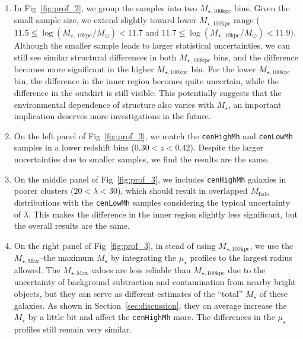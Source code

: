 \documentclass{emulateapj}
\def\rbcg{\texttt{cenHighMh}}
\def\nbcg{\texttt{cenLowMh}}
\def\mstar{{$M_{\star}$}}
\def\mhalo{{$M_{\mathrm{halo}}$}}
\def\mtot{{$M_{\star,100\mathrm{kpc}}$}}
\def\mmax{{$M_{\star,\mathrm{Max}}$}}
\def\mden{{$\mu_{\star}$}}
\begin{document}
\begin{CJK*}{UTF8}{gbsn}
\begin{enumerate}
        \item In Fig~\ref{fig:prof_2}, we group the samples into two \mtot{} bins. 
            Given the small sample size, we extend slightly toward lower \mtot{} range 
            ($11.5 \leq \log (M_{\star,\ 10\mathrm{kpc}}/M_{\odot}) < 11.7$ and 
             $11.7 \leq \log (M_{\star,\ 10\mathrm{kpc}}/M_{\odot}) < 11.9$). 
            Although the smaller sample leads to larger statistical uncertainties, 
            we can still see similar structural differences in both \mtot{} bins, 
            and the difference becomes more significant in the higher \mtot{} bin.  
            For the lower \mtot{} bin, the difference in the inner region becomes 
            quite uncertain, while the difference in the outskirt is still visible. 
            This potentially suggests that the environmental dependence of structure 
            also varies with \mstar{}, an important implication deserves more 
            investigations in the future.   

        \item On the left panel of Fig~\ref{fig:prof_3}, we match the \rbcg{} and 
            \nbcg{} samples in a lower redshift bins ($0.30 < z < 0.42$).
            Despite the larger uncertainties due to smaller samples, we find the 
            results are the same.
            
        \item On the middle panel of Fig~\ref{fig:prof_3}, we includes \rbcg{} 
            galaxies in poorer clusters ($20 < \lambda < 30$), which should result 
            in overlapped \mhalo{} distributions with the \nbcg{} samples 
            considering the typical uncertainty of $\lambda$.
            This makes the difference in the inner region slightly less significant, 
            but the overall results are the same. 
             
        \item On the right panel of Fig~\ref{fig:prof_3}, in stead of using \mtot{}, 
            we use the \mmax{}--the maximum \mstar{} by integrating the \mden{} 
            profiles to the largest radius allowed.  
            The \mmax{} values are less reliable than \mtot{} due to the 
            uncertainty of background subtraction and contamination from nearby 
            bright objects, but they can serve as different estimates of the ``total''
            \mstar{} of these galaxies.
            As shown in Section~\ref{sec:discussion}, they on average increase
            the \mstar{} by a little bit and affect the \rbcg{} more.
            The differences in the \mden{} profiles still remain very similar.
      

\end{enumerate}
\end{CJK*}
\end{document}
